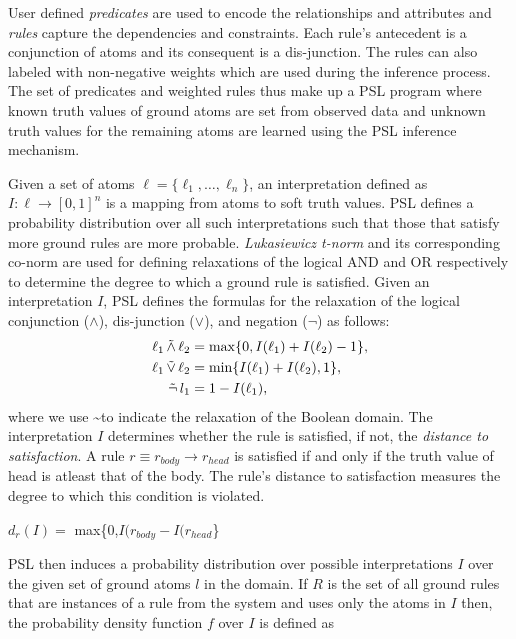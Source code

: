 User defined \emph{predicates} are used to encode the relationships and attributes and \emph{rules} capture the  dependencies and constraints.
Each rule's antecedent is a conjunction of atoms and its consequent is a dis-junction. 
The rules can also labeled with non-negative weights which are used during the inference process. 
The set of predicates and weighted rules thus make up a PSL program where known truth values of ground atoms are set from observed data and unknown truth values for the remaining atoms are learned using the PSL inference mechanism.

Given a set of atoms 
$\ell = \{\ell_1,\ldots,\ell_n\}$,
an interpretation defined as 
$I : \ell \rightarrow [0,1]^n$
is a mapping from atoms to soft truth values.
PSL defines a probability distribution over all such interpretations such that those that satisfy more ground rules are more probable.
\emph{Lukasiewicz t-norm} and its corresponding co-norm are used for defining relaxations of the logical AND and OR respectively to determine the degree to which a ground rule is satisfied.
Given an interpretation $\mathit{I}$, PSL defines the formulas for the relaxation of the logical conjunction ($\wedge$), dis-junction ($\vee$), and negation ($\neg$) as follows:
\begin{align*}
\ell_1 \softand \ell_2 &= \max\{0, I(\ell_1) + I(\ell_2) - 1\},\\
\ell_1 \softor \ell_2 &= \min\{I(\ell_1) + I(\ell_2), 1\},\\
\softneg l_1 &= 1 - I(\ell_1),
\end{align*}  
where we use \textasciitilde to indicate the relaxation of the Boolean domain.
The interpretation $\mathit{I}$ determines whether the rule is satisfied, if not, the \emph{distance to satisfaction}.
A rule $\mathit{r} \equiv \mathit{r_{body}} \rightarrow \mathit{r_{head}} $  is satisfied if and only if the truth value of head is atleast that of the body. The rule's distance to satisfaction measures the degree to which this condition is violated.
\begin{center} 
 $\mathit{d_r}(\mathit{I}) =$ max\{0,$\mathit{I(r_{body}} - \mathit{I(r_{head}}$\}
 \end{center}
PSL then induces a probability distribution over possible interpretations $\mathit{I}$ over the given set of ground atoms $\mathit{l} $ in the domain. 
If $\mathit{R}$ is the set of all ground rules that are instances of a rule from the system and uses only the atoms in  $\mathit{I}$ then,
the probability density function $\mathit{f}$ over $\mathit{I}$ is defined as
